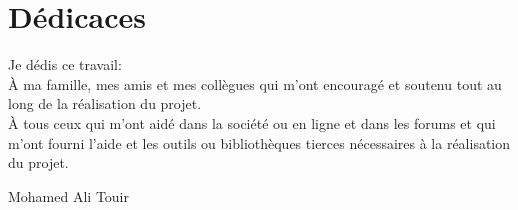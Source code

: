 \chapter*{Dédicaces}
Je dédis ce travail:\\

À ma famille, mes amis et mes collègues qui m'ont encouragé et soutenu tout au long de la réalisation du projet.\\

À tous ceux qui m'ont aidé dans la société ou en ligne et dans les forums et qui m'ont fourni l'aide et les outils ou bibliothèques tierces nécessaires à la réalisation du projet.

\begin{flushright}
Mohamed Ali Touir
\end{flushright}